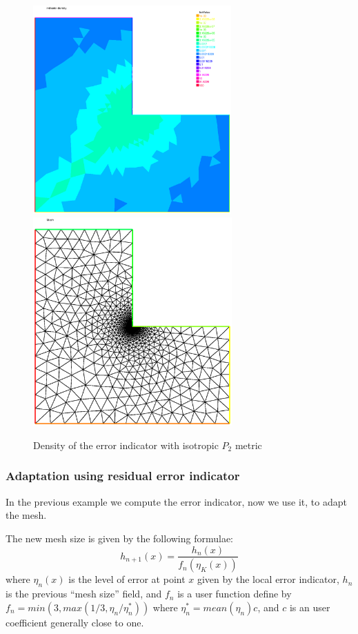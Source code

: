 \documentclass[a4paper,twoside,12pt]{book}
\begin{document}
\begin{example}
\begin{figure}[hbt]
\begin{center}
\includegraphics[height=8cm]{rhoP2} \includegraphics[height=8cm]{ThrhoP2}
\end{center}
\caption{\label{fig:rhoP2}Density of the error indicator  with isotropic $P_{2}$ metric }
\end{figure}
\end{example}

\subsubsection{Adaptation using  residual error indicator}


In the previous example we compute the error indicator,  now
we use it, to adapt the mesh.


The new mesh size is  given by the following formulae:
$$h_{n+1}(x)= \frac{h_{n}(x)}{f_{n}(\eta_K(x))} $$
where $\eta_n(x)$ is the level of error at point $x$ given by the local
error indicator, $h_n$ is the previous ``mesh size'' field, and $f_n$ is a user
function define by
$f_n = min(3,max(1/3,\eta_n / \eta_n^* ))$
 where $ \eta_n^* =mean(\eta_n) c $, and $c$ is an user
 coefficient generally close to one.
\end{document}
